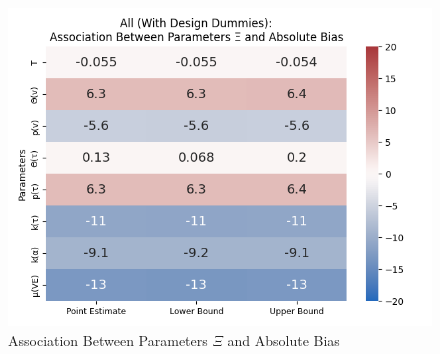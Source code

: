 \documentclass[12pt]{article}
\begin{document}
\begin{figure}[H]
	\centering
	\caption{Association Between Parameters $\Xi$ and Absolute Bias}
	\includegraphics[scale=0.5]{VEMethod_Drivers1b_FEest_Li_Heatmap.png}
\end{figure}
\end{document}
